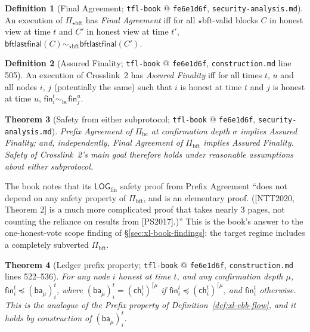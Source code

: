 \documentclass[11pt,a4paper]{article}
\newtheorem{theorem}{Theorem}[section]
\theoremstyle{definition}
\newtheorem{definition}[theorem]{Definition}
\begin{document}
\begin{definition}[Final Agreement; \texttt{tfl-book} @
\texttt{fe6e1d6f}, \texttt{security-analysis.md}]
\label{def:xl-final-agreement-ntt}
An execution of $\Pi_{\star\mathrm{bft}}$ has \emph{Final Agreement}
iff for all $\star$bft-valid blocks $C$ in honest view at time $t$ and
$C'$ in honest view at time $t'$,
$\mathsf{bftlastfinal}(C) \sim_{\star\mathrm{bft}}
\mathsf{bftlastfinal}(C')$.
\end{definition}

\begin{definition}[Assured Finality; \texttt{tfl-book} @
\texttt{fe6e1d6f}, \texttt{construction.md} line 505]
\label{def:xl-assured-finality-ntt}
An execution of Crosslink~2 has \emph{Assured Finality} iff for all times
$t$, $u$ and all nodes $i$, $j$ (potentially the same) such that $i$ is
honest at time $t$ and $j$ is honest at time $u$,
$\mathsf{fin}_i^t \sim_{\mathrm{bc}} \mathsf{fin}_j^u$.
\end{definition}

\begin{theorem}[Safety from either subprotocol; \texttt{tfl-book} @
\texttt{fe6e1d6f}, \texttt{security-analysis.md}]
\label{thm:xl-assured-either}
Prefix Agreement of $\Pi_{\mathrm{bc}}$ at confirmation depth $\sigma$
implies Assured Finality; and, independently, Final Agreement of
$\Pi_{\mathrm{bft}}$ implies Assured Finality. Safety of Crosslink~2's
main goal therefore holds under reasonable assumptions about
\emph{either} subprotocol.
\end{theorem}

The book notes that its $\mathsf{LOG}_{\mathrm{fin}}$ safety proof from
Prefix Agreement ``does not depend on any safety property of
$\Pi_{\mathrm{bft}}$, and is an elementary proof. ([NTT2020, Theorem 2]
is a much more complicated proof that takes nearly 3 pages, not counting
the reliance on results from [PS2017].)'' This is the book's answer to
the one-honest-vote scope finding of \S\ref{sec:xl-book-findings}: the
target regime includes a completely subverted $\Pi_{\mathrm{bft}}$.

\begin{theorem}[Ledger prefix property; \texttt{tfl-book} @
\texttt{fe6e1d6f}, \texttt{construction.md} lines 522--536]
\label{thm:xl-ledger-prefix-ntt}
For any node $i$ honest at time $t$, and any confirmation depth $\mu$,
$\mathsf{fin}_i^t \preceq (\mathsf{ba}_\mu)_i^t$, where
$(\mathsf{ba}_\mu)_i^t = (\mathsf{ch}_i^t)^{\lceil\mu}$ if
$\mathsf{fin}_i^t \preceq (\mathsf{ch}_i^t)^{\lceil\mu}$, and
$\mathsf{fin}_i^t$ otherwise. This is the analogue of the Prefix property
of Definition~\ref{def:xl-ebb-flow}, and it holds by construction of
$(\mathsf{ba}_\mu)_i^t$.
\end{theorem}
\end{document}
